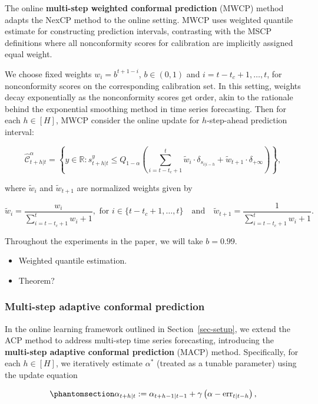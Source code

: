 \documentclass[
  11pt,
  a4paper,
]{article}
\theoremstyle{plain}
\theoremstyle{plain}
\theoremstyle{remark}
\begin{document}
The online \textbf{multi-step weighted conformal prediction} (MWCP)
method adapts the NexCP method to the online setting. MWCP uses weighted
quantile estimate for constructing prediction intervals, contrasting
with the MSCP definitions where all nonconformity scores for calibration
are implicitly assigned equal weight.

We choose fixed weights \(w_i = b^{t+1-i}\), \(b \in (0, 1)\) and
\(i=t-t_c+1,\ldots,t\), for nonconformity scores on the corresponding
calibration set. In this setting, weights decay exponentially as the
nonconformity scores get order, akin to the rationale behind the
exponential smoothing method in time series forecasting. Then for each
\(h \in [H]\), MWCP consider the online update for \(h\)-step-ahead
prediction interval:

\[
\hat{\mathcal{C}}_{t+h|t}^{\alpha} = \left\{y\in\mathbb{R}: s_{t+h|t}^{y} \leq Q_{1-\alpha}\left(\sum_{i=t-t_c+1}^{t}\tilde{w}_i\cdot\delta_{s_{i|i-h}}+\tilde{w}_{t+1}\cdot\delta_{+\infty}\right)\right\},
\]

where \(\tilde{w}_i\) and \(\tilde{w}_{t+1}\) are normalized weights
given by

\[
\tilde{w}_i = \frac{w_i}{\sum_{i=t-t_c+1}^{t}w_i+1}, \text{ for } i \in \{t-t_c+1,\ldots,t\} \quad \text{and} \quad \tilde{w}_{t+1} =  \frac{1}{\sum_{i=t-t_c+1}^{t}w_i+1}.
\]

Throughout the experiments in the paper, we will take \(b = 0.99\).

\begin{itemize}
\item
  Weighted quantile estimation.
\item
  Theorem?
\end{itemize}

\subsubsection{Multi-step adaptive conformal
prediction}\label{multi-step-adaptive-conformal-prediction}

In the online learning framework outlined in Section~\ref{sec-setup}, we
extend the ACP method to address multi-step time series forecasting,
introducing the \textbf{multi-step adaptive conformal prediction} (MACP)
method. Specifically, for each \(h \in [H]\), we iteratively estimate
\(\alpha^{*}\) (treated as a tunable parameter) using the update
equation

\begin{equation}\phantomsection\label{eq-macp}{
\alpha_{t+h|t} := \alpha_{t+h-1|t-1} + \gamma\left(\alpha - \mathrm{err}_{t|t-h}\right),
}\end{equation}
\end{document}
